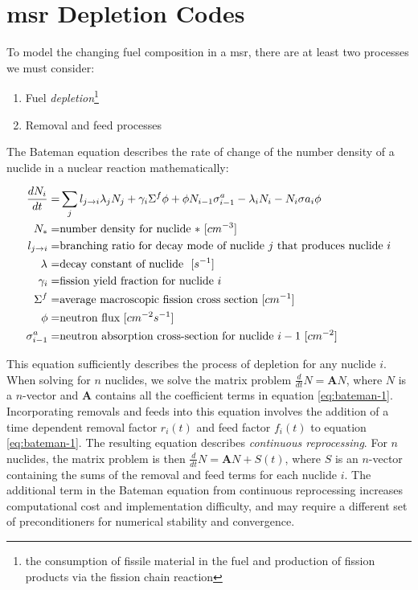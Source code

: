 \section{\Gls{msr} Depletion Codes}%
\label{sec:msr_codes}

To model the changing fuel composition in a \Gls{msr}, there are at least two processes we must consider:
\begin{enumerate}
    \item Fuel {\it depletion}\footnote{the consumption of fissile material in the fuel and production of fission products via the fission chain reaction}
    \item Removal and feed processes
\end{enumerate}

The Bateman equation describes the rate of change of the number density of a nuclide in a nuclear reaction mathematically:

\begin{align}
    \label{eq:bateman-1}
    \frac{dN_{i}}{dt} =& \sum_{j} l_{j\to i}\lambda_{j} N_{j} + \gamma_{i} \Sigma^{f}\phi + \phi N_{i-1} \sigma^{a}_{i-1} - \lambda_{i}N_{i} - N_{i}\sigma{a}_{i}\phi\\
    N_{*} =& \text{number density for nuclide $*$ $[cm^{-3}]$}\nonumber\\
    l_{j\to i} =& \text{branching ratio for decay mode of nuclide $j$ that produces nuclide $i$}\nonumber\\
    \lambda_{\*} =& \text{decay constant of nuclide $\*$ $[s^{-1}]$}\nonumber\\
    \gamma_{i} =& \text{fission yield fraction for nuclide $i$}\nonumber \\
    \Sigma^{f} =& \text{average macroscopic fission cross section $[cm^{-1}]$}\nonumber\\
    \phi =& \text{neutron flux $[cm^{-2}s^{-1}]$}\nonumber\\
    \sigma^{a}_{i-1} =& \text{neutron absorption cross-section for nuclide $i-1$ $[cm^{-2}]$}\nonumber\\
\end{align}
    
This equation sufficiently describes the process of depletion for any nuclide $i$. When solving for $n$ nuclides, we solve the matrix problem $\frac{d}{dt}N = \mathbf{A}N$, where $N$ is a $n$-vector and $\mathbf{A}$ contains all the coefficient terms in equation \ref{eq:bateman-1}. Incorporating removals and feeds into this equation involves the addition of a time dependent removal factor $r_{i}(t)$ and feed factor $f_{i}(t)$ to equation \ref{eq:bateman-1}. The resulting equation describes {\it continuous reprocessing}.
For $n$ nuclides, the matrix problem is then $\frac{d}{dt}N = \mathbf{A}N + S(t)$, where $S$ is an $n$-vector containing the sums of the removal and feed terms for each nuclide $i$. The additional term in the Bateman equation from continuous reprocessing increases computational cost and implementation difficulty, and may require a different set of preconditioners for numerical stability and convergence.


